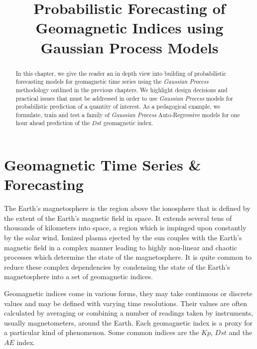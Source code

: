 \documentclass{article}
\title{Probabilistic Forecasting of Geomagnetic Indices using Gaussian Process Models}
\begin{document}
\maketitle

\begin{abstract}

  In this chapter, we give the reader an in depth view into building of
  probabilistic forecasting models for geomagnetic time series using the
  \emph{Gaussian Process} methodology outlined in the previous
  chapters. We highlight design decisions and practical issues that must
  be addressed in order to use \emph{Gaussian Process} models for
  probabilistic prediction of a quantity of interest. As a pedagogical
  example, we formulate, train and test a family of \emph{Gaussian
    Process} Auto-Regressive models for one hour ahead prediction of
  the $Dst$ geomagnetic index.  

\end{abstract}

\section{Geomagnetic Time Series \& Forecasting}

The Earth's magnetosphere is the region above the ionosphere that is
defined by the extent of the Earth's magnetic field in space. It
extends several tens of thousands of kilometers into space, a region
which is impinged upon constantly by the solar wind. Ionized plasma
ejected by the sun couples with the Earth's magnetic field in a
complex manner leading to highly non-linear and chaotic processes
which determine the state of the magnetosphere. It is quite common to
reduce these complex dependencies by condensing the state of the
Earth's magnetosphere into a set of geomagnetic indices.

Geomagnetic indices come in various forms, they may take continuous or
discrete values and may be defined with varying time
resolutions. Their values are often calculated by averaging or
combining a number of readings taken by instruments, usually
magnetometers, around the Earth. Each geomagnetic index is a proxy for
a particular kind of phenomenon. Some common indices are the $Kp$,
$Dst$ and the $AE$ index.
\end{document}
